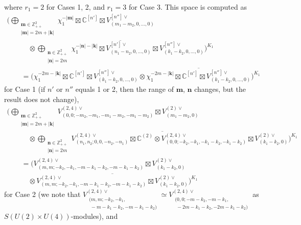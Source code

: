 \documentclass[pdftex]{sigma}
\numberwithin{equation}{section}
\newcommand{\bk}{\mathbf{k}}
\newcommand{\bm}{\mathbf{m}}
\newcommand{\bn}{\mathbf{n}}
\newcommand{\BZ}{\mathbb{Z}}
\newcommand{\BC}{\mathbb{C}}
\begin{document}
where $r_1=2$ for Cases 1, 2, and $r_1=3$ for Case 3. This space is computed as
\begin{gather*}
 \Big(\bigoplus_{\substack{\bm\in\BZ_{++}^2\\ |\bm|=2m+|\bk|}}\chi_1^{-|\bm|}\boxtimes\BC^{[n']}\boxtimes V_{(m_1-m_2,0,\ldots,0)}^{[n'']\vee} \\
\qquad\quad{} \otimes\overline{\bigoplus_{\substack{\bn\in\BZ_{++}^2\\ |\bn|=2m}}
\chi_1^{-|\bn|-|\bk|}\boxtimes V_{(n_1-n_2,0,\ldots,0)}^{[n']\vee}\boxtimes V_{(k_1-k_2,0,\ldots,0)}^{[n'']\vee}}
\Big)^{K_1}\\
 \qquad{} =\Big(\chi_1^{-2m-|\bk|}\boxtimes \BC^{[n']}\boxtimes V_{(k_1-k_2,0,\ldots,0)}^{[n'']\vee}
\otimes\overline{\chi_1^{-2m-|\bk|}\boxtimes \BC^{[n']}\boxtimes V_{(k_1-k_2,0,\ldots,0)}^{[n'']\vee}}\Big)^{K_1}
\end{gather*}
for Case 1 (if $n'$ or $n''$ equals 1 or 2, then the range of $\bm$, $\bn$ changes, but the result does not change),
\begin{gather*}
 \Big(\bigoplus_{\substack{\bm\in\BZ_{++}^2\\ |\bm|=2m+|\bk|}}
V_{(0,0;-m_2,-m_1,-m_1-m_2,-m_1-m_2)}^{(2,4)\vee}\boxtimes V_{(m_1-m_2,0)}^{(2)\vee}\\
\qquad\quad{} \otimes\overline{\bigoplus_{\substack{\bn\in\BZ_{++}^2\\ |\bn|=2m}}
V_{(n_1,n_2;0,0,-n_2,-n_1)}^{(2,4)\vee}\boxtimes\BC^{(2)}
\otimes V_{(0,0;-k_2,-k_1,-k_1-k_2,-k_1-k_2)}^{(2,4)\vee}\boxtimes V_{(k_1-k_2,0)}^{(2)\vee}}
\Big)^{K_1}\\
\qquad{} =\Big(V_{(m,m;-k_2,-k_1,-m-k_1-k_2,-m-k_1-k_2)}^{(2,4)\vee}\boxtimes V_{(k_1-k_2,0)}^{(2)\vee} \\
\qquad\quad{} \otimes\overline{V_{(m,m;-k_2,-k_1,-m-k_1-k_2,-m-k_1-k_2)}^{(2,4)\vee}\boxtimes V_{(k_1-k_2,0)}^{(2)\vee}}\Big)^{K_1}
\end{gather*}
for Case 2 (we note that $V_{\substack{(m,m;-k_2,-k_1,\hspace{40pt}\\ \; -m-k_1-k_2,-m-k_1-k_2)}}^{(2,4)\vee}
\simeq V_{\substack{(0,0;-m-k_2,-m-k_1,\hspace{30pt}\\ \; -2m-k_1-k_2,-2m-k_1-k_2)}}^{(2,4)\vee}$ as $S(U(2)\times U(4))$-modules), and
\end{document}

